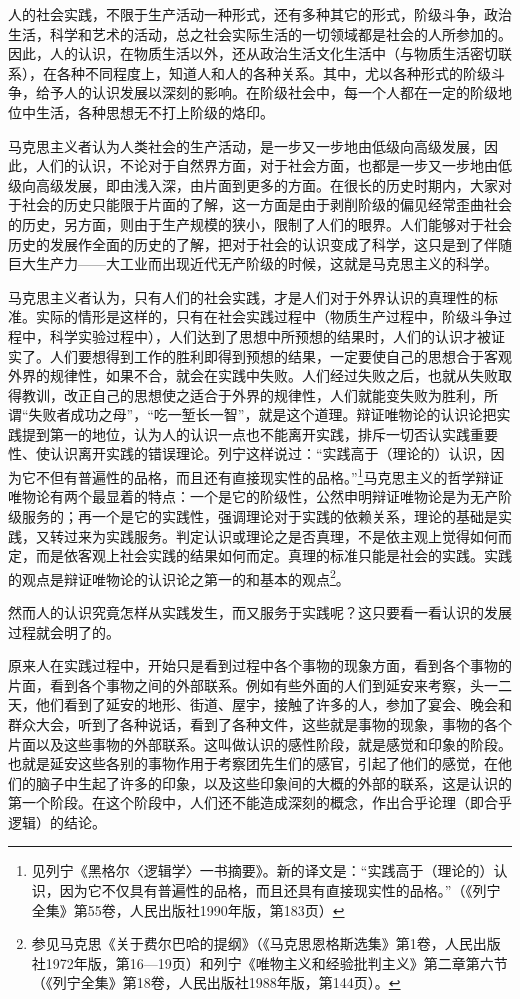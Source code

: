 \documentclass[UTF8, 12pt, a4paper]{ctexrep}
\begin{document}
人的社会实践，不限于生产活动一种形式，还有多种其它的形式，阶级斗争，政治生活，科学和艺术的活动，总之社会实际生活的一切领域都是社会的人所参加的。因此，人的认识，在物质生活以外，还从政治生活文化生活中（与物质生活密切联系），在各种不同程度上，知道人和人的各种关系。其中，尤以各种形式的阶级斗争，给予人的认识发展以深刻的影响。在阶级社会中，每一个人都在一定的阶级地位中生活，各种思想无不打上阶级的烙印。

马克思主义者认为人类社会的生产活动，是一步又一步地由低级向高级发展，因此，人们的认识，不论对于自然界方面，对于社会方面，也都是一步又一步地由低级向高级发展，即由浅入深，由片面到更多的方面。在很长的历史时期内，大家对于社会的历史只能限于片面的了解，这一方面是由于剥削阶级的偏见经常歪曲社会的历史，另方面，则由于生产规模的狭小，限制了人们的眼界。人们能够对于社会历史的发展作全面的历史的了解，把对于社会的认识变成了科学，这只是到了伴随巨大生产力——大工业而出现近代无产阶级的时候，这就是马克思主义的科学。

马克思主义者认为，只有人们的社会实践，才是人们对于外界认识的真理性的标准。实际的情形是这样的，只有在社会实践过程中（物质生产过程中，阶级斗争过程中，科学实验过程中），人们达到了思想中所预想的结果时，人们的认识才被证实了。人们要想得到工作的胜利即得到预想的结果，一定要使自己的思想合于客观外界的规律性，如果不合，就会在实践中失败。人们经过失败之后，也就从失败取得教训，改正自己的思想使之适合于外界的规律性，人们就能变失败为胜利，所谓“失败者成功之母”，“吃一堑长一智”，就是这个道理。辩证唯物论的认识论把实践提到第一的地位，认为人的认识一点也不能离开实践，排斥一切否认实践重要性、使认识离开实践的错误理论。列宁这样说过：“实践高于（理论的）认识，因为它不但有普遍性的品格，而且还有直接现实性的品格。”\footnote{见列宁《黑格尔〈逻辑学〉一书摘要》。新的译文是：“实践高于（理论的）认识，因为它不仅具有普遍性的品格，而且还具有直接现实性的品格。”（《列宁全集》第55卷，人民出版社1990年版，第183页）}马克思主义的哲学辩证唯物论有两个最显着的特点：一个是它的阶级性，公然申明辩证唯物论是为无产阶级服务的；再一个是它的实践性，强调理论对于实践的依赖关系，理论的基础是实践，又转过来为实践服务。判定认识或理论之是否真理，不是依主观上觉得如何而定，而是依客观上社会实践的结果如何而定。真理的标准只能是社会的实践。实践的观点是辩证唯物论的认识论之第一的和基本的观点\footnote{参见马克思《关于费尔巴哈的提纲》（《马克思恩格斯选集》第1卷，人民出版社1972年版，第16—19页）和列宁《唯物主义和经验批判主义》第二章第六节（《列宁全集》第18卷，人民出版社1988年版，第144页）。}。

然而人的认识究竟怎样从实践发生，而又服务于实践呢？这只要看一看认识的发展过程就会明了的。

原来人在实践过程中，开始只是看到过程中各个事物的现象方面，看到各个事物的片面，看到各个事物之间的外部联系。例如有些外面的人们到延安来考察，头一二天，他们看到了延安的地形、街道、屋宇，接触了许多的人，参加了宴会、晚会和群众大会，听到了各种说话，看到了各种文件，这些就是事物的现象，事物的各个片面以及这些事物的外部联系。这叫做认识的感性阶段，就是感觉和印象的阶段。也就是延安这些各别的事物作用于考察团先生们的感官，引起了他们的感觉，在他们的脑子中生起了许多的印象，以及这些印象间的大概的外部的联系，这是认识的第一个阶段。在这个阶段中，人们还不能造成深刻的概念，作出合乎论理（即合乎逻辑）的结论。
\end{document}
